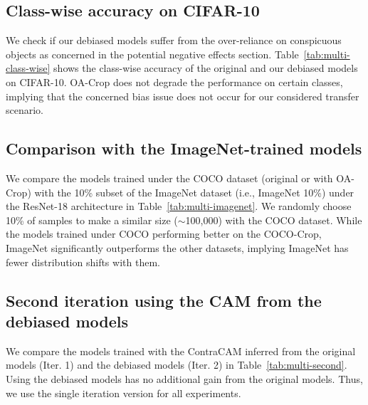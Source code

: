 


\newpage
\subsection{Class-wise accuracy on CIFAR-10}
\label{sec:add-multi-class-wise}

We check if our debiased models suffer from the over-reliance on conspicuous objects as concerned in the potential negative effects section. Table~\ref{tab:multi-class-wise} shows the class-wise accuracy of the original and our debiased models on CIFAR-10. OA-Crop does not degrade the performance on certain classes, implying that the concerned bias issue does not occur for our considered transfer scenario.




\subsection{Comparison with the ImageNet-trained models}
\label{sec:add-multi-imagenet}

We compare the models trained under the COCO dataset (original or with OA-Crop) with the 10\% subset of the ImageNet dataset (i.e., ImageNet 10\%) under the ResNet-18 architecture in Table~\ref{tab:multi-imagenet}. We randomly choose 10\% of samples to make a similar size ($\sim$100,000) with the COCO dataset. While the models trained under COCO performing better on the COCO-Crop, ImageNet significantly outperforms the other datasets, implying ImageNet has fewer distribution shifts with them.




\subsection{Second iteration using the CAM from the debiased models}
\label{sec:add-multi-second}

We compare the models trained with the ContraCAM inferred from the original models (Iter. 1) and the debiased models (Iter. 2) in Table~\ref{tab:multi-second}. Using the debiased models has no additional gain from the original models. Thus, we use the single iteration version for all experiments.


